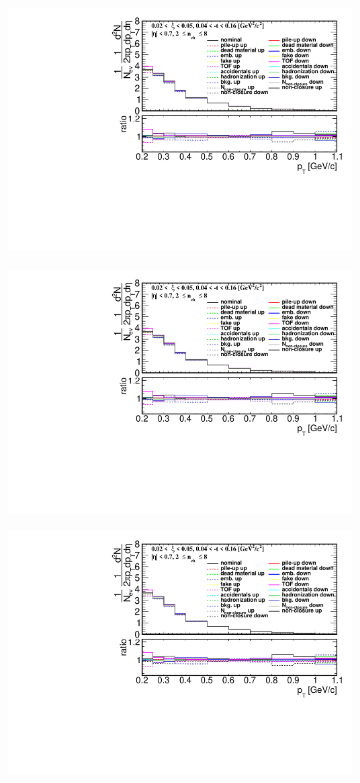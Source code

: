 \begin{figure}[h!]
	\centering
	\begin{subfigure}{.49\textwidth}	
		\includegraphics[width=\textwidth,page=1]{chapters/chrgSTAR/img/syst/out_chargedmax.pdf}
	\end{subfigure}
	\begin{subfigure}{.49\textwidth}
		\includegraphics[width=\textwidth,page=7]{chapters/chrgSTAR/img/syst/out_chargedmax.pdf}
	\end{subfigure}
	\begin{subfigure}{.49\textwidth}
		\includegraphics[width=\textwidth,page=13]{chapters/chrgSTAR/img/syst/out_chargedmax.pdf}

\end{subfigure}
\end{figure}
